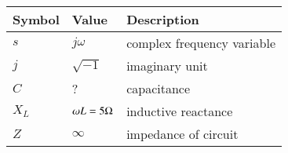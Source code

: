 \begin{tabular}{ | m{1.0cm} | m{1.5cm} |m{2.5cm} |} 
  \hline
 Symbol & Value &Description\\ 
 \hline
$s$&  $j \omega$& complex frequency variable\\
\hline
$j$& $\sqrt{-1}$ &imaginary unit \\
\hline
$C$& ?&  capacitance \\
\hline
$X_L$&$\omega L=5 \ohm$& inductive reactance  \\
\hline
$Z$&$\infty$& impedance of circuit  \\
\hline
\end{tabular}\\
\label{rajmalt4gate21ee}
\caption{}
